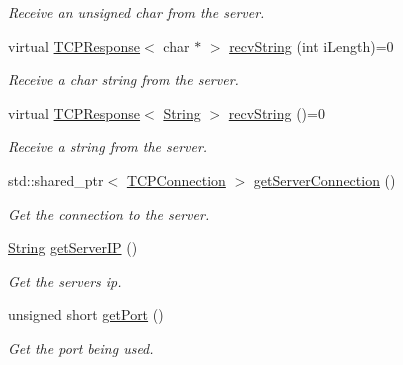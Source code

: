 \begin{DoxyCompactItemize}
\begin{DoxyCompactList}\small\item\em Receive an unsigned char from the server. \end{DoxyCompactList}\item 
virtual \mbox{\hyperlink{class_rad_j_a_v_1_1_networking_1_1_t_c_p_response}{T\+C\+P\+Response}}$<$ char $\ast$ $>$ \mbox{\hyperlink{class_rad_j_a_v_1_1_networking_1_1_tcpip_client_a595f73382914bb43e70db21bd9f3977a}{recv\+String}} (int i\+Length)=0
\begin{DoxyCompactList}\small\item\em Receive a char string from the server. \end{DoxyCompactList}\item 
virtual \mbox{\hyperlink{class_rad_j_a_v_1_1_networking_1_1_t_c_p_response}{T\+C\+P\+Response}}$<$ \mbox{\hyperlink{class_rad_j_a_v_1_1_string}{String}} $>$ \mbox{\hyperlink{class_rad_j_a_v_1_1_networking_1_1_tcpip_client_ae6ab4734a0461ffe393f6ff2302c0dbe}{recv\+String}} ()=0
\begin{DoxyCompactList}\small\item\em Receive a string from the server. \end{DoxyCompactList}\item 
std\+::shared\+\_\+ptr$<$ \mbox{\hyperlink{class_rad_j_a_v_1_1_networking_1_1_t_c_p_connection}{T\+C\+P\+Connection}} $>$ \mbox{\hyperlink{class_rad_j_a_v_1_1_networking_1_1_tcpip_client_a197d35a074998e466226ea7e43dae060}{get\+Server\+Connection}} ()
\begin{DoxyCompactList}\small\item\em Get the connection to the server. \end{DoxyCompactList}\item 
\mbox{\hyperlink{class_rad_j_a_v_1_1_string}{String}} \mbox{\hyperlink{class_rad_j_a_v_1_1_networking_1_1_tcpip_client_ae03a4a7b2e26c9cf5dbcd788a4694c47}{get\+Server\+IP}} ()
\begin{DoxyCompactList}\small\item\em Get the server\textquotesingle{}s ip. \end{DoxyCompactList}\item 
unsigned short \mbox{\hyperlink{class_rad_j_a_v_1_1_networking_1_1_tcpip_client_a781d9448692dec592e0bf1fa5814a74a}{get\+Port}} ()
\begin{DoxyCompactList}\small\item\em Get the port being used. \end{DoxyCompactList}\item 

\end{DoxyCompactItemize}
